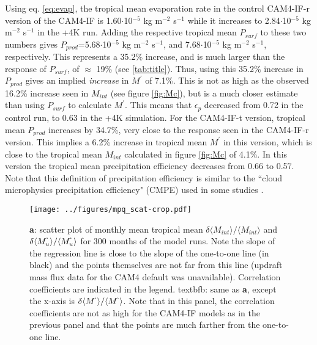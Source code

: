 \documentclass[letterpaper,12pt,titlepage,oneside,final]{book}
\begin{document}
Using eq. \ref{eq:evap}, the tropical mean evaporation rate in the control CAM4-IF-r version of the CAM4-IF is 1.60$\cdot$10$^{-5}$ kg m$^{-2}$ s$^{-1}$ while it increases to 2.84$\cdot$10$^{-5}$ kg m$^{-2}$ s$^{-1}$ in the +4K run. Adding the respective tropical mean $P_{surf}$ to these two numbers gives $P_{prod}$=5.68$\cdot$10$^{-5}$ kg m$^{-2}$ s$^{-1}$, and 7.68$\cdot$10$^{-5}$ kg m$^{-2}$ s$^{-1}$, respectively. This represents a 35.2\% increase, and is much larger than the response of $P_{surf}$, of $\approx$ 19\% (see \ref{tab:title}). Thus, using this 35.2\% increase in $P_{prod}$ gives an implied \textit{increase} in $M^{'}$ of 7.1\%. This is not as high as the observed 16.2\% increase seen in $M_{int}$ (see figure \ref{fig:Mc}), but is a much closer estimate than using $P_{surf}$ to calculate $M^{'}$. This means that $\epsilon_{p}$ decreased from 0.72 in the control run, to 0.63 in the +4K simulation. For the CAM4-IF-t version, tropical mean $P_{prod}$ increases by 34.7\%, very close to the response seen in the CAM4-IF-r version. This implies a 6.2\% increase in tropical mean $M^{'}$ in this version, which is close to the tropical mean $M_{int}$ calculated in figure \ref{fig:Mc} of 4.1\%. In this version the tropical mean precipitation efficiency decreases from 0.66 to 0.57. Note that this definition of precipitation efficiency is similar to the ``cloud microphysics precipitation efficiency" (CMPE) used in some studies \citep{schoenberg_ferrier_factors_1996,sui_definition_2007}.

\begin{figure}[H]
\centering
\noindent\texttt{[image: ../figures/mpq\_scat-crop.pdf]}\hfill
\caption{\textbf{a}: scatter plot of monthly mean tropical mean $\delta{\langle{M_{int}}}\rangle/\langle{M_{int}}\rangle$ and $\delta{\langle{M_{u}^{`}}}\rangle/\langle{M_{u}^{`}}\rangle$ for 300 months of the model runs. Note the slope of the regression line is close to the slope of the one-to-one line (in black) and the points themselves are not far from this line (updraft mass flux data for the CAM4 default was unavailable). Correlation coefficients are indicated in the legend. textbf{b}: same as \textbf{a}, except the x-axis is $\delta{\langle{M^{`}}}\rangle/\langle{M^{`}}\rangle$. Note that in this panel, the correlation coefficients are not as high for the CAM4-IF models as in the previous panel and that the points are much farther from the one-to-one line.   }
\end{figure}
\end{document}
